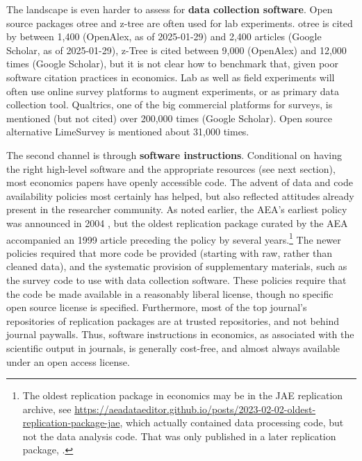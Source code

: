 \documentclass{article}
\begin{document}
The landscape is even harder to assess for \textbf{data collection software}. Open source packages otree and z-tree are often used for lab experiments. otree is cited  by between 1,400 (OpenAlex, as of 2025-01-29) and 2,400 articles (Google Scholar, as of 2025-01-29), z-Tree is cited between 9,000 (OpenAlex) and 12,000 times (Google Scholar), but it is not clear how to benchmark that, given poor software citation practices in economics. Lab as well as field experiments will often use online survey platforms to augment experiments, or as primary data collection tool. Qualtrics, one of the big commercial platforms for surveys, is mentioned (but not cited) over 200,000 times (Google Scholar). Open source alternative LimeSurvey is mentioned about 31,000 times.



The second channel is through  \textbf{software instructions}. Conditional on having the right high-level software and the appropriate resources (see next section), most economics papers have openly accessible code. The advent of data and code availability policies most certainly has helped, but also reflected attitudes already present in the researcher community. As noted earlier, the AEA's earliest policy was announced in 2004 \citep{bernanke_editorial_2004}, but the oldest replication package curated by the AEA accompanied an 1999 article \citep{frankel_does_1999,frankel_replication_1999} preceding the policy by several years.\footnote{The oldest  replication package in economics may be \citet{koenker_asymptotic_1988-1} in the JAE replication archive, see \url{https://aeadataeditor.github.io/posts/2023-02-02-oldest-replication-package-jae}, which actually contained data processing code, but not the data analysis code. That was only published in a later replication package, \citet{koenker_reproducible_2009}.} The newer policies \citep{AEA-announcement-July-2019,koren_data_2022} required that more code be provided (starting with raw, rather than cleaned data), and the systematic provision of supplementary materials, such as the survey code to use with data collection software. These policies require that the code be made available in a reasonably liberal license, though no specific open source license is specified. Furthermore, most of the top journal's repositories of replication packages are at trusted repositories, and not behind journal paywalls. Thus, software instructions in economics, as associated with the scientific output in journals, is generally cost-free, and almost always available under an open access license. 
\end{document}
